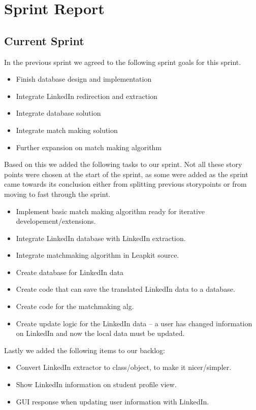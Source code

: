 \section{Sprint Report}

\subsection{Current Sprint}

In the previous sprint we agreed to the following sprint goals for this sprint. 
\begin{itemize}
    \item Finish database design and implementation
    \item Integrate LinkedIn redirection and extraction
    \item Integrate database solution
    \item Integrate match making solution
    \item Further expansion on match making algorithm
\end{itemize}
Based on this we added the following tasks to our sprint. Not all these story points were chosen at the start of the 
sprint, as some were added as the sprint came towards its conclusion either from splitting previous storypoints or 
from moving to fast through the sprint.
\begin{itemize}
    \item Implement basic match making algorithm ready for iterative developement/extensions.
    \item Integrate LinkedIn database with LinkedIn extraction. 
    \item Integrate matchmaking algorithm in Leapkit source.
    \item Create database for LinkedIn data
    \item Create code that can save the translated LinkedIn data to a database.
    \item Create code for the matchmaking alg.
    \item Create update logic for the LinkedIn data -- a user has changed information on LinkedIn and now the local data must be updated.
\end{itemize}
Lastly we added the following items to our backlog:
\begin{itemize}
    \item Convert LinkedIn extractor to class/object, to make it nicer/simpler.
    \item Show LinkedIn information on student profile view.
    \item GUI response when updating user information with LinkedIn.
\end{itemize}

